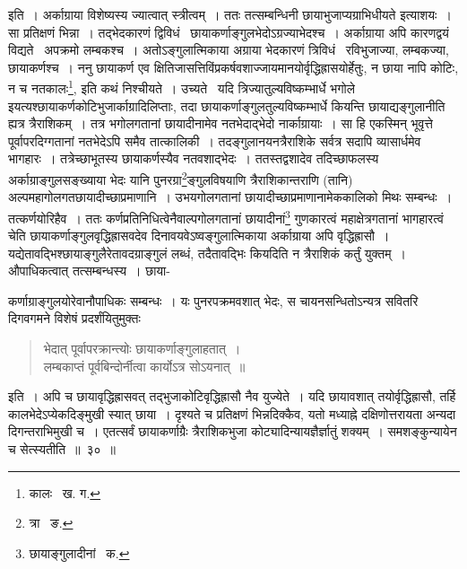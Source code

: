 \documentclass[11pt, openany]{book}
\begin{document}
\noindent इति~। अर्काग्राया विशेष्यस्य ज्यात्वात् स्त्रीत्वम्~। ततः तत्सम्बन्धिनी छायाभुजाप्यग्राभिधीयते इत्याशयः~। सा प्रतिक्षणं भिन्ना~। तद्भेदकारणं द्विविधं \textendash\ छायाकर्णाङ्गुलभेदोऽग्रज्याभेदश्च~। अर्काग्राया अपि कारणद्वयं विद्यते \textendash\ अपक्रमो लम्बकश्च~। अतोऽङ्गुलात्मिकाया अग्राया भेदकारणं त्रिविधं \textendash\ रविभुजाज्या, लम्बकज्या, छायाकर्णश्च~। ननु छायाकर्ण एव क्षितिजासत्तिविंप्रकर्षवशाज्जायमानयोर्वृद्धिह्रासयोर्हेतुः, न छाया नापि कोटिः, न च नतकालः\renewcommand{\thefootnote}{१}\footnote{कालः \textendash\ ख. ग.}, इति कथं निश्चीयते~। 
उच्यते \textendash\ यदि त्रिज्यातुल्यविष्कम्भार्धे भगोले इयत्यश्छायाकर्णकोटिभुजार्काग्रादिलिप्ताः, तदा छायाकर्णाङ्गुलतुल्यविष्कम्भार्धे कियन्ति 
छायाद्यङ्गुलानीति ह्यत्र त्रैराशिकम्~। तत्र भगोलगतानां छायादीनामेव नतभेदाद्भेदो नार्काग्रायाः~। सा हि एकस्मिन् भूवृत्ते
पूर्वापरदिग्गतानां नतभेदेऽपि समैव तात्कालिकी~। तदङ्गुलानयनत्रैराशिके सर्वत्र सदापि व्यासार्धमेव भागहारः~। तत्रेच्छाभूतस्य छायाकर्णस्यैव नतवशाद्भेदः~। ततस्तद्वशादेव तदिच्छाफलस्य अर्काग्राङ्गुलसङ्ख्याया भेदः यानि पुनरग्रा\renewcommand{\thefootnote}{२}\footnote{त्रा \textendash\ ङ.}ङ्गुलविषयाणि त्रैराशिकान्तराणि (तानि) अल्पमहागोलगतछायादीच्छाप्रमाणानि~। उभयगोलगतानां छायादीच्छाप्रमाणानामेककालिको मिथः सम्बन्धः~। तत्कर्णयोरिहैव~। ततः कर्णप्रतिनिधित्वेनैवाल्पगोलगतानां छायादीनां\renewcommand{\thefootnote}{३}\footnote{छायाङ्गुलादीनां \textendash\ क.} गुणकारत्वं महाक्षेत्रगतानां भागहारत्वं चेति छायाकर्णाङ्गुलवृद्धिह्रासवदेव दिनावयवेऽष्वङ्गुलात्मिकाया अर्काग्राया अपि वृद्धिह्रासौ~। यद्येतावद्भिश्छायाङ्गुलैरेतावदग्राङ्गुलं लब्धं, तदैतावद्भिः कियदिति न त्रैराशिकं कर्तुं युक्तम्~। औपाधिकत्वात् तत्सम्बन्धस्य~। छाया- 

\newpage

\noindent कर्णाग्राङ्गुलयोरेवानौपाधिकः सम्बन्धः~। यः पुनरपक्रमवशात् भेदः, स चायनसन्धितोऽन्यत्र सवितरि दिगवगमने विशेषं प्रदर्शंयितुमुक्तः\textendash

\begin{quote}
{\qt भेदात् पूर्वापरक्रान्त्योः छायाकर्णाङ्गुलाहतात्~। \\
 लम्बकाप्तं पूर्वबिन्दोर्नीत्वा कार्योऽत्र सोऽयनात्~॥} 
\end{quote}

\noindent इति~। अपि च छायावृद्धिह्रासवत् तद्भुजाकोटिवृद्धिह्रासौ नैव युज्येते~। यदि छायावशात् तयोर्वृद्धिह्रासौ, तर्हि कालभेदेऽप्येकदिङ्मुखी स्यात् छाया~। दृश्यते च प्रतिक्षणं भिन्नदिक्कैव, यतो मध्याह्ने दक्षिणोत्तरायता अन्यदा दिगन्तराभिमुखी च~। एतत्सर्वं छायाकर्णाग्रैः त्रैराशिकभुजा कोट्यादिन्यायज्ञैर्ज्ञातुं शक्यम्~। समशङ्कुन्यायेन च सेत्स्यतीति~॥~३०~॥\\
\end{document}
